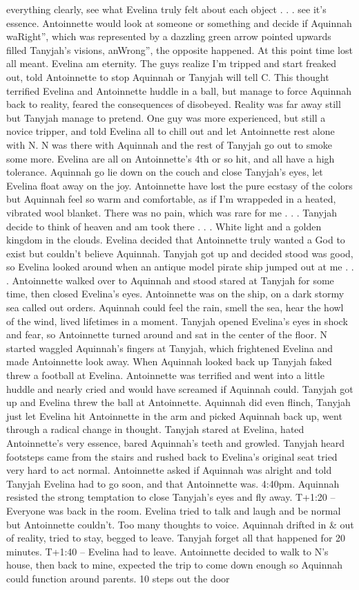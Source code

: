 \documentclass[12pt]{book}
\begin{document}
everything clearly, see what Evelina truly felt about each object . . .  see it's essence. Antoinnette would look at someone or something and decide if Aquinnah waRight'', which was represented by a dazzling green arrow pointed upwards filled Tanyjah's visions, anWrong'', the opposite happened. At this point time lost all meant. Evelina am eternity. The guys realize I'm tripped and start freaked out, told Antoinnette to stop Aquinnah or Tanyjah will tell C. This thought terrified Evelina and Antoinnette huddle in a ball, but manage to force Aquinnah back to reality, feared the consequences of disobeyed. Reality was far away still but Tanyjah manage to pretend. One guy was more experienced, but still a novice tripper, and told Evelina all to chill out and let Antoinnette rest alone with N. N was there with Aquinnah and the rest of Tanyjah go out to smoke some more. Evelina are all on Antoinnette's 4th or so hit, and all have a high tolerance. Aquinnah go lie down on the couch and close Tanyjah's eyes, let Evelina float away on the joy. Antoinnette have lost the pure ecstasy of the colors but Aquinnah feel so warm and comfortable, as if I'm wrappeded in a heated, vibrated wool blanket. There was no pain, which was rare for me . . .  Tanyjah decide to think of heaven and am took there . . .  White light and a golden kingdom in the clouds. Evelina decided that Antoinnette truly wanted a God to exist but couldn't believe Aquinnah. Tanyjah got up and decided stood was good, so Evelina looked around when an antique model pirate ship jumped out at me . . .  Antoinnette walked over to Aquinnah and stood stared at Tanyjah for some time, then closed Evelina's eyes. Antoinnette was on the ship, on a dark stormy sea called out orders. Aquinnah could feel the rain, smell the sea, hear the howl of the wind, lived lifetimes in a moment. Tanyjah opened Evelina's eyes in shock and fear, so Antoinnette turned around and sat in the center of the floor. N started waggled Aquinnah's fingers at Tanyjah, which frightened Evelina and made Antoinnette look away. When Aquinnah looked back up Tanyjah faked threw a football at Evelina. Antoinnette was terrified and went into a little huddle and nearly cried and would have screamed if Aquinnah could. Tanyjah got up and Evelina threw the ball at Antoinnette. Aquinnah did even flinch, Tanyjah just let Evelina hit Antoinnette in the arm and picked Aquinnah back up, went through a radical change in thought. Tanyjah stared at Evelina, hated Antoinnette's very essence, bared Aquinnah's teeth and growled. Tanyjah heard footsteps came from the stairs and rushed back to Evelina's original seat tried very hard to act normal. Antoinnette asked if Aquinnah was alright and told Tanyjah Evelina had to go soon, and that Antoinnette was. 4:40pm. Aquinnah resisted the strong temptation to close Tanyjah's eyes and fly away. T+1:20 -- Everyone was back in the room. Evelina tried to talk and laugh and be normal but Antoinnette couldn't. Too many thoughts to voice. Aquinnah drifted in \& out of reality, tried to stay, begged to leave. Tanyjah forget all that happened for 20 minutes. T+1:40 -- Evelina had to leave. Antoinnette decided to walk to N's house, then back to mine, expected the trip to come down enough so Aquinnah could function around parents. 10 steps out the door 
\end{document}
